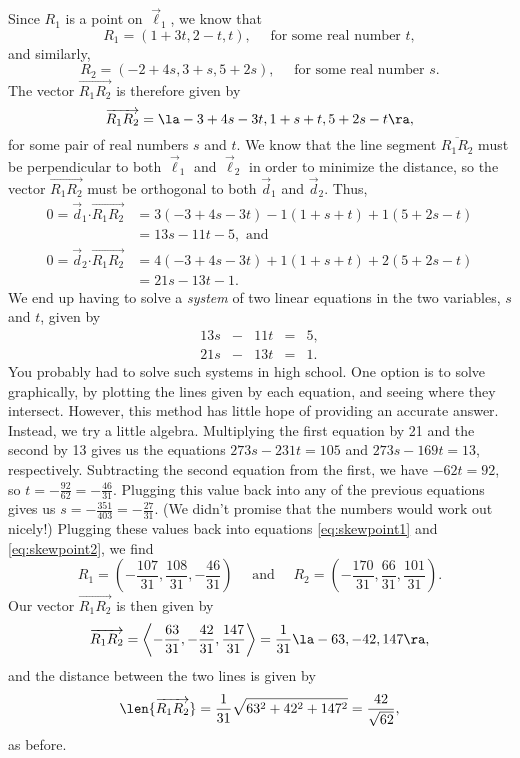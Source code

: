 {Since $R_1$ is a point on $\vec\ell_1$, we know that 
\begin{equation}\label{eq:skewpoint1}
R_1 = (1+3t, 2-t, t), \quad \text{ for some real number } t,
\end{equation}
and similarly, 
\begin{equation}\label{eq:skewpoint2}
R_2 = (-2+4s, 3+s, 5+2s), \quad \text{ for some real number } s.
\end{equation}
The vector $\overrightarrow{R_1R_2}$ is therefore given by
\[
\overrightarrow{R_1R_2}=\la -3+4s-3t, 1+s+t, 5+2s-t\ra,
\]
for some pair of real numbers $s$ and $t$. We know that the line segment $\overline{R_1R_2}$ must be perpendicular to both $\vec\ell_1$ and $\vec\ell_2$ in order to minimize the distance, so the vector $\overrightarrow{R_1R_2}$ must be orthogonal to both $\vec{d}_1$ and $\vec{d}_2$. Thus,
\begin{align*}
0 = \vec{d}_1\boldsymbol{\cdot}\overrightarrow{R_1R_2} & = 3(-3+4s-3t)-1(1+s+t)+1(5+2s-t)\\
 &=13s-11t-5, \text{ and}\\
0 = \vec{d}_2\boldsymbol{\cdot}\overrightarrow{R_1R_2} & = 4(-3+4s-3t)+1(1+s+t)+2(5+2s-t)\\
& = 21s-13t-1.
\end{align*}
We end up having to solve a \textit{system} of two linear equations in the two variables, $s$ and $t$, given by
\[
\begin{array}{ccccc}
13s&-&11t&=&5,\\
21s&-&13t&=&1.
\end{array}
\]
You probably had to solve such systems in high school. One option is to solve graphically, by plotting the lines given by each equation, and seeing where they intersect. However, this method has little hope of providing an accurate answer. Instead, we try a little algebra. Multiplying the first equation by 21 and the second by 13 gives us the equations $273s-231t=105$ and $273s-169t=13$, respectively. Subtracting the second equation from the first, we have $-62t = 92$, so $t=-\frac{92}{62}=-\frac{46}{31}$. Plugging this value back into any of the previous equations gives us $s=-\frac{351}{403}=-\frac{27}{31}$. (We didn't promise that the numbers would work out nicely!) Plugging these values back into equations \eqref{eq:skewpoint1} and \eqref{eq:skewpoint2}, we find
\[
R_1 = \left(-\frac{107}{31}, \frac{108}{31}, -\frac{46}{31}\right) \quad \text{ and } \quad R_2 = \left(-\frac{170}{31}, \frac{66}{31}, \frac{101}{31}\right).
\]
Our vector $\overrightarrow{R_1R_2}$ is then given by
\[
\overrightarrow{R_1R_2} = \left\langle -\frac{63}{31}, -\frac{42}{31}, \frac{147}{31}\right\rangle = \frac{1}{31}\la -63, -42, 147\ra,
\]
and the distance between the two lines is given by
\[
\len{\overrightarrow{R_1R_2}} = \frac{1}{31}\sqrt{63^2+42^2+147^2} = \frac{42}{\sqrt{62}},
\]
as before.
}\\


